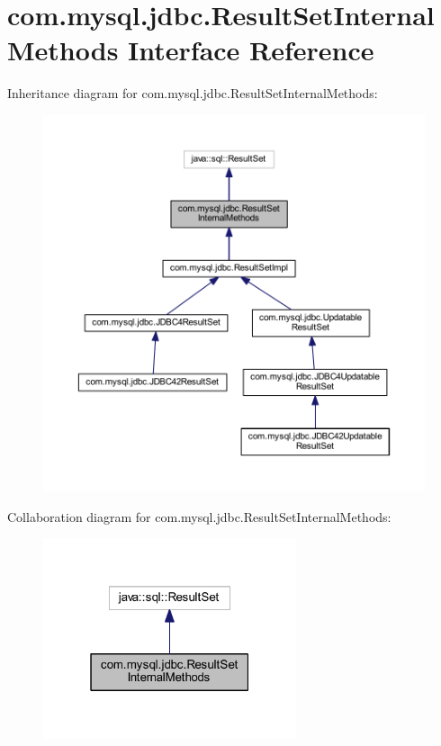 \hypertarget{interfacecom_1_1mysql_1_1jdbc_1_1_result_set_internal_methods}{}\section{com.\+mysql.\+jdbc.\+Result\+Set\+Internal\+Methods Interface Reference}
\label{interfacecom_1_1mysql_1_1jdbc_1_1_result_set_internal_methods}


Inheritance diagram for com.\+mysql.\+jdbc.\+Result\+Set\+Internal\+Methods\+:
\nopagebreak
\begin{figure}[H]
\begin{center}
\leavevmode
\includegraphics[width=350pt]{interfacecom_1_1mysql_1_1jdbc_1_1_result_set_internal_methods__inherit__graph}
\end{center}
\end{figure}


Collaboration diagram for com.\+mysql.\+jdbc.\+Result\+Set\+Internal\+Methods\+:
\nopagebreak
\begin{figure}[H]
\begin{center}
\leavevmode
\includegraphics[width=211pt]{interfacecom_1_1mysql_1_1jdbc_1_1_result_set_internal_methods__coll__graph}
\end{center}
\end{figure}
